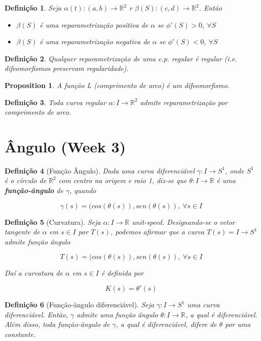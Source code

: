\documentclass{article}
\newtheorem{prop}{Proposition}
\newtheorem{definition}{Definição}
\begin{document}
\begin{definition}
Seja $\alpha(t): (a, b) \rightarrow \mathbb{R}^2$ r $\beta(S): (c, d) \rightarrow \mathbb{R}^2$. Então

\begin{itemize}
    \item $\beta(S)$ é uma reparametrização positiva de $\alpha$ se $\phi'(S) > 0,\ \forall S$
    \item $\beta(S)$ é uma reparametrização negativa de $\alpha$ se $\phi'(S) < 0,\ \forall S$
\end{itemize}
\end{definition}

\begin{definition}
Qualquer reparametrização de uma c.p. regular é regular (i.e. difeomorfismos preservam regularidade).
\end{definition}

\begin{prop}
A função L (comprimento de arco) é um difeomorfismo.
\end{prop}

\begin{definition}
Toda curva regular $\alpha: I \rightarrow \mathbb{R}^2$ admite reparametrização por comprimento de arco.
\end{definition}

\section*{Ângulo (Week 3)}
\label{s3}

\begin{definition}[Função Ângulo]
Dada uma curva diferenciável $\gamma: I \rightarrow S^1$, onde $S^1$ é o círculo de $\mathbb{R}^2$ com centro na origem e raio 1, diz-se que $\theta: I \rightarrow \mathbb{R}$ é uma \textbf{função-ângulo} de $\gamma$, quando

$$\gamma(s) = (cos(\theta(s)), sen(\theta(s)),\ \forall s \in I$$
\end{definition}

\begin{definition}[Curvatura]
Seja $\alpha: I \rightarrow \mathbb{R}$ unit-speed. Designando-se o vetor tangente de $\alpha$ em $s \in I$ por $T(s)$, podemos afirmar que a curva $T(s) = I \rightarrow S^1$ admite função ângulo

$$T(s) = (cos(\theta(s)), sen(\theta(s)),\ \forall s \in I$$

Daí a curvatura de $\alpha$ em $s \in I$ é definida por

$$K(s) = \theta'(s)$$
\end{definition}

\begin{definition}[Função-ângulo diferenciável]
Seja $\gamma: I \rightarrow S^1$ uma curva diferenciável. Então, $\gamma$ admite uma função ângulo $\theta: I \rightarrow \mathbb{R}$, a qual é diferenciável. Além disso, toda função-ângulo de $\gamma$, a qual é diferenciável, difere de $\theta$ por uma constante.
\end{definition}
\end{document}
